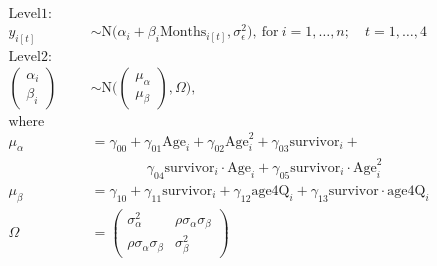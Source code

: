 \documentclass{article}
\begin{document}
$$
\begin{aligned}
\mathrm{Level 1:} \phantom{2cm} & \\
        y_{i[t]} &\sim \mathrm{N}\bigl(\alpha_{i} + 
        \beta_{i} \mathrm{Months}_{i[t]}, \sigma^2_{\epsilon}\bigr),\ 
    \mathrm{for}\ i = 1, \dots, n;\quad  t = 1, \dots, 4  \\
\mathrm{Level 2:} \phantom{2cm} & \\
    \begin{pmatrix}
    \alpha_{i}\\
    \beta_{i}
    \end{pmatrix} &\sim \mathrm{N} \Biggl(
      \begin{pmatrix}
       \mu_{\alpha}\\
       \mu_{\beta}
      \end{pmatrix}\! \!,
      \Omega  
      \Biggr), \\
    \mathrm{where}& \\
        \mu_{\alpha} &=
        \gamma_{00} +
        \gamma_{01} \mathrm{Age}_i + 
        \gamma_{02} \mathrm{Age}^2_i + 
        \gamma_{03} \mathrm{survivor}_i + \\
        & \qquad \qquad 
        \gamma_{04} \mathrm{survivor}_i\cdot \mathrm{Age}_i+ 
        \gamma_{05} \mathrm{survivor}_i\cdot \mathrm{Age}^2_i 
        \\
        \mu_{\beta} &= 
        \gamma_{10} + \gamma_{11} \mathrm{survivor}_i + 
        \gamma_{12} \mathrm{age4Q}_i + %
        \gamma_{13} \mathrm{survivor}\cdot \mathrm{age4Q}_i \\
     \Omega &= \begin{pmatrix}
        \sigma^2_\alpha & \rho \sigma_\alpha \sigma_{\beta} \\
        \rho \sigma_\alpha \sigma_\beta & \sigma^2_\beta
       \end{pmatrix}
\end{aligned}
$$
\end{document}
